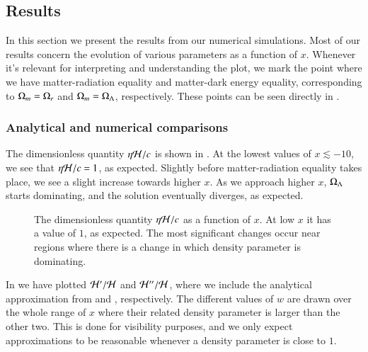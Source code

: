 \subsection{Results}\label{ssec:M1:results}
In this section we present the results from our numerical simulations. Most of our results concern the evolution of various parameters as a function of $x$. Whenever it's relevant for interpreting and understanding the plot, we mark the point where we have matter-radiation equality and matter-dark energy equality, corresponding to $\Omega_{m}=\Omega_{r}$ and $\Omega_{m}=\Omega_{\Lambda}$, respectively. These points can be seen directly in . 

\subsubsection{Analytical and numerical comparisons}
The dimensionless quantity $\eta\mathcal{H}/c$ is shown in . At the lowest values of $x\lesssim-10$, we see that $\eta\mathcal{H}/c=1$, as expected. Slightly before matter-radiation equality takes place, we see a slight increase towards higher $x$. As we approach higher $x$, $\Omega_{\Lambda}$ starts dominating, and the solution eventually diverges, as expected.  
\begin{figure}[ht!]
    \caption{The dimensionless quantity $\eta\mathcal{H}/c$ as a function of $x$. At low $x$ it has a value of $1$, as expected. The most significant changes occur near regions where there is a change in which density parameter is dominating.}
    \label{fig:M1:results:compare_eta_H_over_c}
\end{figure}

In  we have plotted $\mathcal{H}'/\mathcal{H}$ and $\mathcal{H}''/\mathcal{H}$, where we include the analytical approximation from  and , respectively. The different values of $w$ are drawn over the whole range of $x$ where their related density parameter is larger than the other two. This is done for visibility purposes, and we only expect approximations to be reasonable whenever a density parameter is close to $1$. 

